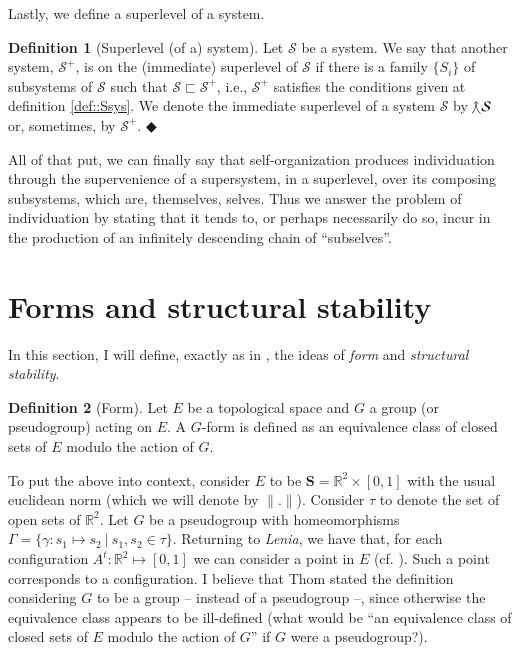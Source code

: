 \documentclass[12pt, a4paper]{article} %
\theoremstyle{definition}
\newtheorem{definition}{Definition}[section]
\newcommand\Slv[2][]{\hspace{-0.9pt}{\curlywedgeuparrow^{#1}}{#2}}
\begin{document}
	Lastly, we define a superlevel of a system. 
	
	\begin{definition}[Superlevel (of a) system] \label{def::Slevel}
		Let $\mathcal{S}$ be a system. We say that another system, $\mathcal{S}^+$, is on the (immediate) superlevel of $\mathcal{S}$ if there is a family $\{S_i\}$ of subsystems of $\mathcal{S}$ such that $\mathcal{S} \sqsubset \mathcal{S}^+$, i.e., $\mathcal{S}^+$ satisfies the conditions given at definition \ref{def::Ssys}. We denote the immediate superlevel of a system $\mathcal{S}$ by $\Slv{\mathcal{S}}$ or, sometimes, by $\mathcal{S}^+$. $\Diamondblack$
	\end{definition}
	
	All of that put, we can finally say that self-organization produces individuation through the supervenience of a supersystem, in a superlevel, over its composing subsystems, which are, themselves, selves. Thus we answer the problem of individuation by stating that it tends to, or perhaps necessarily do so, incur in the production of an infinitely descending chain of ``subselves''. 
	
	\section{Forms and structural stability}
	
	In this section, I will define, exactly as in \cite{Thom1982}, the ideas of \textit{form} and \textit{structural stability}.
	
	\begin{definition}[Form]
		Let $E$ be a topological space and $G$ a group (or pseudogroup) acting on $E$. A $G$-form is defined as an equivalence class of closed sets of $E$ modulo the action of $G$.
	\end{definition}
	
	To put the above into context, consider $E$ to be $\mathbf{S} = \mathbb{R}^2 \times [0, 1]$ with the usual euclidean norm (which we will denote by $\| . \|$). Consider $\tau$ to denote the set of open sets of $\mathbb{R}^2$. Let $G$ be a pseudogroup with homeomorphisms $\Gamma = \{ \gamma : s_1 \mapsto s_2 \ | \ s_1, s_2 \in \tau \}$. Returning to \textit{Lenia}, we have that, for each configuration $A^t : \mathbb{R}^2 \mapsto [0, 1]$ we can consider a point in $E$ (cf. \citet{Chan2019}). Such a point corresponds to a configuration. I believe that Thom stated the definition considering $G$ to be a group -- instead of a pseudogroup --, since otherwise the equivalence class appears to be ill-defined (what would be ``an equivalence class of closed sets of $E$ modulo the action of $G$'' if $G$ were a pseudogroup?).
	
\end{document}
